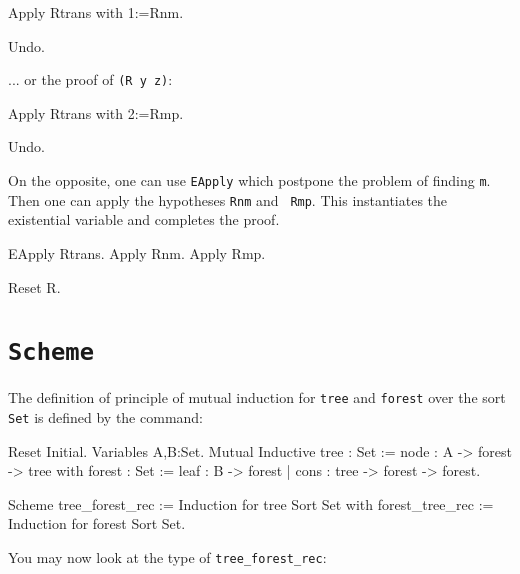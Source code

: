 \begin{coq_example*}
\begin{coq_example}
Apply Rtrans with 1:=Rnm.
\end{coq_example}

\begin{coq_eval}
  Undo.
\end{coq_eval}

... or the proof of {\tt (R y z)}:

\begin{coq_example}
Apply Rtrans with 2:=Rmp.
\end{coq_example}

\begin{coq_eval}
  Undo.
\end{coq_eval}

On the opposite, one can use {\tt EApply} which postpone the problem
of finding {\tt m}. Then one can apply the hypotheses {\tt Rnm} and {\tt
Rmp}. This instantiates the existential variable and completes the proof.

\begin{coq_example}
EApply Rtrans.
Apply Rnm.
Apply Rmp.
\end{coq_example}

\begin{coq_eval}
  Reset R.
\end{coq_eval}

\section{{\tt Scheme}}
\label{Scheme-examples}

\firstexample
{}

The definition of principle of mutual induction for {\tt tree} and
{\tt forest} over the sort {\tt Set} is defined by the command:

\begin{coq_eval}
Reset Initial.
Variables A,B:Set.
Mutual Inductive tree : Set :=  node : A -> forest -> tree
with forest : Set := leaf : B -> forest 
                   | cons : tree -> forest -> forest.
\end{coq_eval}

\begin{coq_example*}
Scheme tree_forest_rec := Induction for tree Sort Set 
with forest_tree_rec := Induction for forest Sort Set.
\end{coq_example*}

You may now look at the type of {\tt tree\_forest\_rec}:


\end{coq_example*}

